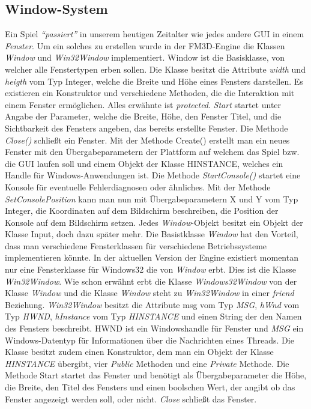 \subsection{Window-System}

Ein Spiel \textit{"`passiert"'} in unserem heutigen Zeitalter wie jedes andere GUI in einem \textit{Fenster}. Um ein solches zu erstellen wurde in der FM3D-Engine die Klassen \textit{Window} und \textit{Win32Window} implementiert.
Window ist die Basisklasse, von welcher alle Fenstertypen erben sollen.
Die Klasse besitzt die Attribute \textit{width} und \textit{heigth} vom Typ Integer, welche die Breite und Höhe eines Fensters darstellen.
Es existieren ein Konstruktor und verschiedene Methoden, die die Interaktion mit einem Fenster ermöglichen. Alles erwähnte ist \textit{protected}.
\textit{Start} startet unter Angabe der Parameter, welche die Breite, Höhe, den Fenster Titel, und die Sichtbarkeit des Fensters angeben, das bereits erstellte Fenster.
Die Methode \textit{Close()} schließt ein Fenster. Mit der Methode Create() erstellt man ein neues Fenster mit den Übergabeparametern der Plattform auf welchem das Spiel bzw. die GUI laufen soll und einem Objekt der Klasse HINSTANCE, welches ein Handle für Windows-Anwendungen ist. Die Methode \textit{StartConsole()} startet eine Konsole für eventuelle Fehlerdiagnosen oder ähnliches. Mit der Methode \textit{SetConsolePosition} kann man nun mit Übergabeparametern X und Y vom Typ Integer, die Koordinaten auf dem Bildschirm beschreiben, die Position der Konsole auf dem Bildschirm setzen.
Jedes \textit{Window}-Objekt besitzt ein Objekt der Klasse Input, doch dazu später mehr. Die Basistklasse \textit{Window} hat den Vorteil, dass man verschiedene Fensterklassen für verschiedene Betriebssysteme implementieren könnte. In der aktuellen Version der Engine existiert momentan nur eine Fensterklasse für Windows32 die von \textit{Window} erbt. Dies ist die Klasse  \textit{Win32Window}. 
Wie schon erwähnt erbt die Klasse \textit{Windows32Window} von der Klasse \textit{Window} und die Klasse \textit{Window} steht zu \textit{Win32Window} in einer \textit{friend} Beziehung.
\textit{Win32Window} besitzt die Attribute msg vom Typ \textit{MSG}, \textit{hWnd} vom Typ \textit{HWND}, \textit{hInstance} vom Typ \textit{HINSTANCE} und einen String der den Namen des Fensters beschreibt.
HWND ist ein Windowshandle für Fenster und \textit{MSG} ein Windows-Datentyp für Informationen über die Nachrichten eines Threads. 
Die Klasse besitzt zudem einen Konstruktor, dem man ein Objekt der Klasse \textit{HINSTANCE} übergibt, vier \textit{Public} Methoden und eine \textit{Private} Methode. Die Methode Start startet das Fenster und benötigt als Übergabeparameter die Höhe, die Breite, den Titel des Fensters und einen boolschen Wert, der angibt ob das Fenster angezeigt werden soll, oder nicht.
\textit{Close} schließt das Fenster.

